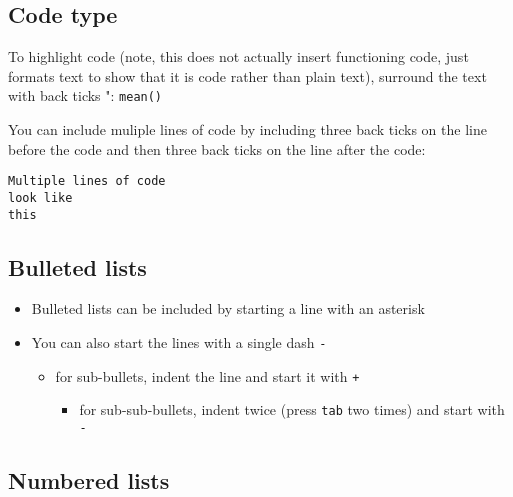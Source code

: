 \documentclass[]{article}
\providecommand{\tightlist}{%
  \setlength{\itemsep}{0pt}\setlength{\parskip}{0pt}}
\begin{document}
\hypertarget{code-type}{%
\subsection{Code type}\label{code-type}}

To highlight code (note, this does not actually insert functioning code,
just formats text to show that it is code rather than plain text),
surround the text with back ticks ": \texttt{mean()}

You can include muliple lines of code by including three back ticks on
the line before the code and then three back ticks on the line after the
code:

\begin{verbatim}
Multiple lines of code
look like 
this
\end{verbatim}

\hypertarget{bulleted-lists}{%
\subsection{Bulleted lists}\label{bulleted-lists}}

\begin{itemize}
\item
  Bulleted lists can be included by starting a line with an asterisk
\item
  You can also start the lines with a single dash \texttt{-}

  \begin{itemize}
  \tightlist
  \item
    for sub-bullets, indent the line and start it with \texttt{+}

    \begin{itemize}
    \tightlist
    \item
      for sub-sub-bullets, indent twice (press \texttt{tab} two times)
      and start with \texttt{-}
    \end{itemize}
  \end{itemize}
\end{itemize}

\hypertarget{numbered-lists}{%
\subsection{Numbered lists}\label{numbered-lists}}
\end{document}
